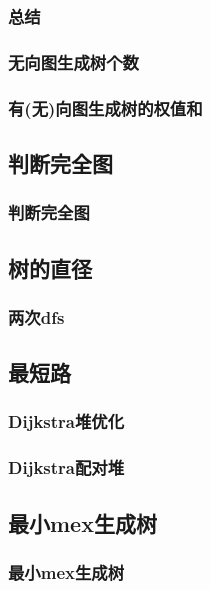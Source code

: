 \documentclass[10pt,a4paper]{article}
\begin{document}
	\subsubsection{总结}
	
	\subsubsection{无向图生成树个数}
	
	\subsubsection{有(无)向图生成树的权值和}
	
	\subsection{判断完全图}
	\subsubsection{判断完全图}
	
	\subsection{树的直径}
	\subsubsection{两次dfs}
	
	\subsection{最短路}
	\subsubsection{Dijkstra堆优化}
	
	\subsubsection{Dijkstra配对堆}
	
	\subsection{最小mex生成树}
	\subsubsection{最小mex生成树}
	
\end{document}
